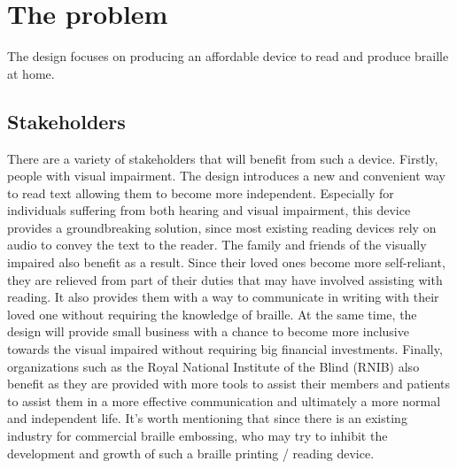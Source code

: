 \section{The problem}
The design focuses on producing an affordable device to read and produce braille at home.
 

\subsection{Stakeholders}
There are a variety of stakeholders that will benefit from such a device.
Firstly, people with visual impairment.
The design introduces a new and convenient way to read text allowing them to become more independent.
Especially for individuals suffering from both hearing and visual impairment, this device provides a groundbreaking solution, since most existing reading devices rely on audio to convey the text to the reader.
The family and friends of the visually impaired also benefit as a result.
Since their loved ones become more self-reliant, they are relieved from part of their duties that may have involved assisting with reading.
It also provides them with a way to communicate in writing with their loved one without requiring the knowledge of braille.
At the same time, the design will provide small business with a chance to become more inclusive towards the visual impaired without requiring big financial investments.
Finally, organizations such as the Royal National Institute of the Blind (RNIB) also benefit as they are provided with more tools to assist their members and patients to assist them in a more effective communication and ultimately a more normal and independent life.
It's worth mentioning that since there is an existing industry for commercial braille embossing, who may try to inhibit the development and growth of such a braille printing / reading device.


